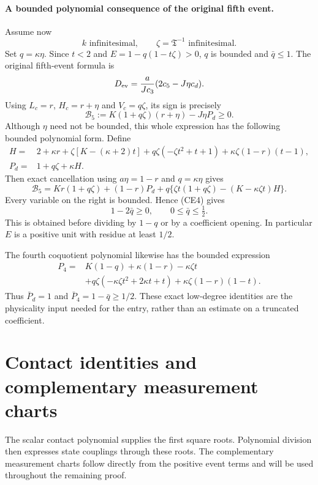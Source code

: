 \paragraph{A bounded polynomial consequence of the original fifth event.}
Assume now
\[
                 k\text{ infinitesimal},\qquad
                 \zeta=\mathfrak T^{-1}\text{ infinitesimal}.     \tag{CE3}
\]
Set $q=\kappa\eta$. Since $t<2$ and $E=1-q(1-t\zeta)>0$, $q$ is
bounded and $\bar q\le1$. The original fifth-event formula is
\[
 D_{\rm ev}=\frac{a}{Jc_3}(2c_5-J\eta c_d).
\]
Using $L_c=r$, $H_c=r+\eta$ and $V_c=q\zeta$, its sign is precisely
\[
 \mathcal B_5:=K(1+q\zeta)(r+\eta)-J\eta P_d\ge0.       \tag{CE4}
\]
Although $\eta$ need not be bounded, this whole expression has the
following bounded polynomial form. Define
\begin{align*}
 H={}&2+\kappa r+\zeta[K-(\kappa+2)t]
     +q\zeta(-\zeta t^2+t+1)
     +\kappa\zeta(1-r)(t-1),\\
 P_d={}&1+q\zeta+\kappa H.
\end{align*}
Then exact cancellation using $a\eta=1-r$ and $q=\kappa\eta$ gives
\[
 \mathcal B_5=Kr(1+q\zeta)+(1-r)P_d
       +q\{\zeta t(1+q\zeta)-(K-\kappa\zeta t)H\}.     \tag{CE5}
\]
Every variable on the right is bounded. Hence (CE4) gives
\[
       1-2\bar q\ge0,\qquad 0\le\bar q\le\tfrac12.     \tag{CE6}
\]
This is obtained before dividing by $1-q$ or by a coefficient opening.
In particular $E$ is a positive unit with residue at least $1/2$.

The fourth coquotient polynomial likewise has the bounded expression
\[
\begin{split}
 P_4={}&K(1-q)+\kappa(1-r)-\kappa\zeta t\\
 &+q\zeta(-\kappa\zeta t^2+2\kappa t+t)
   +\kappa\zeta(1-r)(1-t).
\end{split}                                                       \tag{CE7}
\]
Thus $\bar P_d=1$ and $\bar P_4=1-\bar q\ge1/2$.
These exact low-degree identities are the physicality input needed
for the entry, rather than an estimate on a truncated coefficient.



\section{Contact identities and complementary measurement charts}
The scalar contact polynomial supplies the first square roots. Polynomial division then expresses state couplings through these roots. The complementary measurement charts follow directly from the positive event terms and will be used throughout the remaining proof.

